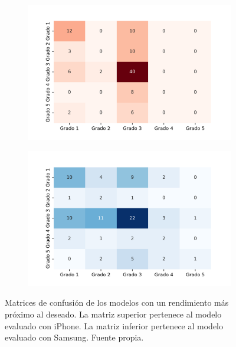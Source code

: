 \begin{figure}[!t]
\centering
\begin{subfigure}[t]{0.7\textwidth}
  \includegraphics[width=\textwidth]{img/Confussion_matrix_iphone.png}
\end{subfigure}

\vspace{0.1cm} %

\begin{subfigure}[t]{0.7\textwidth}
  \includegraphics[width=\textwidth]{img/Confussion_matrix_samsung.png}
\end{subfigure}

\caption{Matrices de confusión de los modelos con un rendimiento más próximo al deseado. La matriz superior pertenece al modelo evaluado con iPhone. La matriz inferior pertenece al modelo evaluado con Samsung. Fuente propia.}
\label{fig:matrices}
\end{figure}

